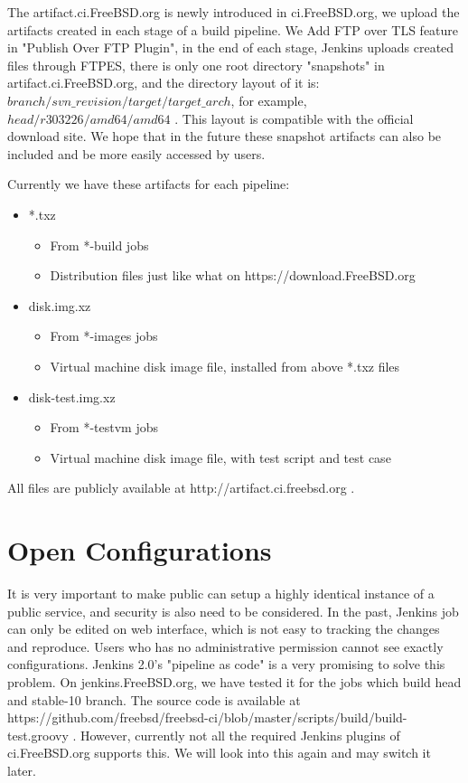 \documentclass[a4paper,twocolumn,10pt]{article}
\begin{document}
The artifact.ci.FreeBSD.org is newly introduced in ci.FreeBSD.org, we upload
the artifacts created in each stage of a build pipeline. We Add FTP over TLS
feature in "Publish Over FTP Plugin", in the end of each stage, Jenkins uploads
created files through FTPES, there is only one root directory  "snapshots" in
artifact.ci.FreeBSD.org, and the directory layout of it is:
${branch}/{svn\_revision}/{target}/{target\_arch}$, for example,
$head/r303226/amd64/amd64$ . This layout is compatible with the official
download site. We hope that in the future these snapshot artifacts can also be
included and be more easily accessed by users.

Currently we have these artifacts for each pipeline:

\begin{itemize}
\item *.txz
  \begin{itemize}
  \item From *-build jobs
  \item Distribution files just like what on https://download.FreeBSD.org
  \end{itemize}
\item disk.img.xz
  \begin{itemize}
  \item From *-images jobs
  \item Virtual machine disk image file, installed from above *.txz files
  \end{itemize}
\item disk-test.img.xz
  \begin{itemize}
  \item From *-testvm jobs
  \item Virtual machine disk image file, with test script and test case
  \end{itemize}
\end{itemize}

All files are publicly available at http://artifact.ci.freebsd.org .

\section{Open Configurations}
It is very important to make public can setup a highly identical instance of a
public service, and security is also need to be considered. In the past,
Jenkins job can only be edited on web interface, which is not easy to tracking
the changes and reproduce. Users who has no administrative permission cannot
see exactly configurations. Jenkins 2.0’s "pipeline as code" is a very
promising to solve this problem. On jenkins.FreeBSD.org, we have tested it for
the jobs which build head and stable-10 branch. The source code is available at
https://github.com/freebsd/freebsd-ci/blob/master/scripts/build/build-test.groovy
. However, currently not all the required Jenkins plugins of ci.FreeBSD.org
supports this. We will look into this again and may switch it later.
\end{document}
